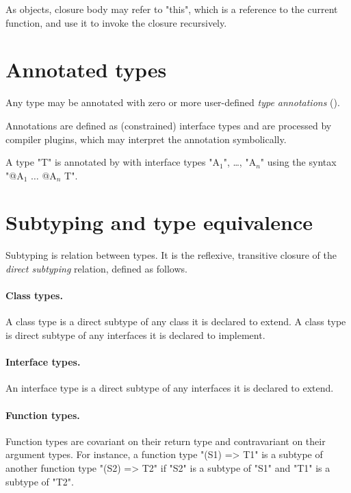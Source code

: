 As objects, closure body may refer to
\xcd"this", which is a reference to the current function,
and use it to invoke the closure recursively.

\section{Annotated types}
\label{AnnotatedTypes}


        Any \Xten{} type may be annotated with zero or more
        user-defined \emph{type annotations}
        ().  

        Annotations are defined as (constrained) interface types and are
        processed by compiler plugins, which may interpret the
        annotation symbolically.

        A type \xcd"T" is annotated by with interface types
        \xcdmath"A$_1$", \dots,
        \xcdmath"A$_n$"
        using the syntax
        \xcdmath"@A$_1$ $\dots$ @A$_n$ T".

\section{Subtyping and type equivalence}\label{DepType:Equivalence}

Subtyping is relation between types.  It is the
reflexive, transitive 
closure of the {\em direct subtyping} relation, defined as
follows.

\paragraph{Class types.}  A class type is a direct subtype of
any
class it is declared to extend.  A class type is direct subtype
of any interfaces it is declared to implement.

\paragraph{Interface types.}  An interface type is a direct
subtype of any interfaces it is declared to extend.

\paragraph{Function types.}

Function types are covariant on their return type and
contravariant on their argument types.
For instance,
a function type
\xcd"(S1) => T1" 
is a subtype of another function type
\xcd"(S2) => T2" 
if \xcd"S2" is a subtype of \xcd"S1"
and \xcd"T1" is a subtype of \xcd"T2".

